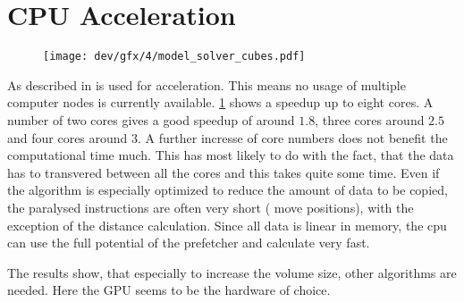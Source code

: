 \section{CPU Acceleration}
% 
\begin{figure}[!t]
\centering
\texttt{[image: dev/gfx/4/model\_solver\_cubes.pdf]}
\caption[speedup]{ }
\label{fig:solverSpeedup}
\end{figure}
% 
% 
As described in \dummy{} \openmp{} is used for acceleration.
This means no usage of multiple computer nodes is currently available.
\cref{fig:solverSpeedup} shows a speedup up to eight cores.
A number of two cores gives a good speedup of around $1.8$, three cores around $2.5$ and four cores around $3$.
A further incresse of core numbers does not benefit the computational time much.
This has most likely to do with the fact, that the data has to transvered between all the cores and this takes quite some time.
Even if the algorithm is especially optimized to reduce the amount of data to be copied, the paralysed instructions are often very short (\eg{} move positions), with the exception of the distance calculation.
Since all data is linear in memory, the cpu can use the full potential of the prefetcher and calculate very fast.
\par
% 
The results show, that especially to increase the volume size, other algorithms are needed. 
Here the \ac{GPU} seems to be the hardware of choice.
% 
% 
% 
